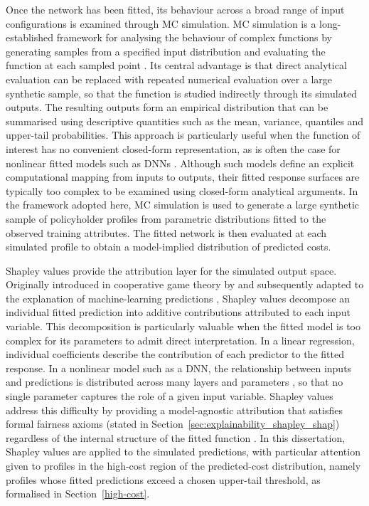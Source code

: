 \noindent
Once the network has been fitted, its behaviour across a broad range of
input configurations is examined through MC simulation.  MC
simulation is a long-established framework for analysing the behaviour of
complex functions by generating samples from a specified input distribution
and evaluating the function at each sampled point
\citep{glasserman2004monte, rubinstein2016simulation, owen2013monte}.  Its
central advantage is that direct analytical evaluation can be replaced with
repeated numerical evaluation over a large synthetic sample, so that the
function is studied indirectly through its simulated outputs.  The resulting
outputs form an empirical distribution that can be summarised using
descriptive quantities such as the mean, variance, quantiles and upper-tail
probabilities.  This approach is particularly useful when the function of
interest has no convenient closed-form representation, as is often the case
for nonlinear fitted models such as DNNs
\citep{goodfellow2016deep, hornik1989multilayer}.  Although such models
define an explicit computational mapping from inputs to outputs, their
fitted response surfaces are typically too complex to be examined using
closed-form analytical arguments.  In the framework adopted here, MC
simulation is used to generate a large synthetic sample of policyholder
profiles from parametric distributions fitted to the observed training
attributes.  The fitted network is then evaluated at each simulated profile
to obtain a model-implied distribution of predicted costs.

\noindent
Shapley values provide the attribution layer for the simulated output space.
Originally introduced in cooperative game theory by \citet{shapley1953value}
and subsequently adapted to the explanation of machine-learning predictions
\citep{lundberg2017unified, rozemberczki2022shapley}, Shapley values
decompose an individual fitted prediction into additive contributions
attributed to each input variable.  This decomposition is particularly
valuable when the fitted model is too complex for its parameters to admit
direct interpretation.  In a linear regression, individual coefficients
describe the contribution of each predictor to the fitted response.  In a
nonlinear model such as a DNN, the relationship between inputs and
predictions is distributed across many layers and parameters
\citep{goodfellow2016deep}, so that no single parameter captures the role
of a given input variable.  Shapley values address this difficulty by
providing a model-agnostic attribution that satisfies formal fairness
axioms (stated in Section~\ref{sec:explainability_shapley_shap})
regardless of the internal structure of the fitted function
\citep{lundberg2017unified, rozemberczki2022shapley}.  In this dissertation,
Shapley values are applied to the simulated predictions, with particular
attention given to profiles in the high-cost region of the predicted-cost
distribution, namely profiles whose fitted predictions exceed a chosen
upper-tail threshold, as formalised in Section~\ref{high-cost}.

